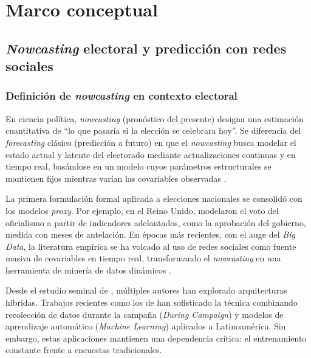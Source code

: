 

\chapter{Marco conceptual}\label{ch:marco}

\section{\textit{Nowcasting} electoral y predicción con redes sociales}

\subsection{Definición de \textit{nowcasting} en contexto electoral}

En ciencia política, \textit{nowcasting} (pronóstico del presente) designa una estimación cuantitativa de ``lo que pasaría si la elección se celebrara hoy''. Se diferencia del \textit{forecasting} clásico (predicción a futuro) en que el \textit{nowcasting} busca modelar el estado actual y latente del electorado mediante actualizaciones continuas y en tiempo real, basándose en un modelo cuyos parámetros estructurales se mantienen fijos mientras varían las covariables observadas \parencite{lewisbeck2011nowcasting, lewisbeck2014proxy}.

La primera formulación formal aplicada a elecciones nacionales se consolidó con los modelos \textit{proxy}. Por ejemplo, en el Reino Unido, \textcite{lewisbeck2011nowcasting} modelaron el voto del oficialismo a partir de indicadores adelantados, como la aprobación del gobierno, medida con meses de antelación. En épocas más recientes, con el auge del \textit{Big Data}, la literatura empírica se ha volcado al uso de redes sociales como fuente masiva de covariables en tiempo real, transformando el \textit{nowcasting} en una herramienta de minería de datos dinámicos \parencite{skoric2020}. 

Desde el estudio seminal de \textcite{tumasjan2010}, múltiples autores han explorado arquitecturas híbridas. Trabajos recientes como los de \textcite{brito2022measuring, brito2023somen} han sofisticado la técnica combinando recolección de datos durante la campaña (\textit{During Campaign}) y modelos de aprendizaje automático (\textit{Machine Learning}) aplicados a Latinoamérica. Sin embargo, estas aplicaciones mantienen una dependencia crítica: el entrenamiento constante frente a encuestas tradicionales.

